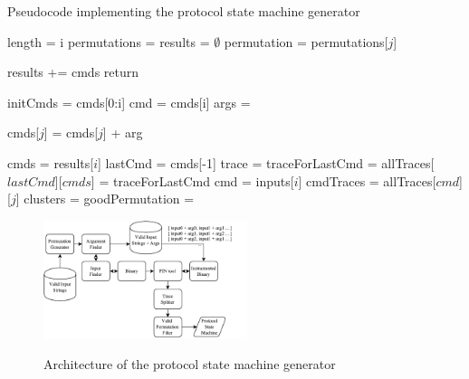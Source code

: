 \documentclass{acm_proc_article-sp}
\begin{document}
\begin{algorithm}
\caption{Pseudocode implementing the protocol state machine generator}
\label{psmcode}
\begin{algorithmic}[1]
\State length = i
\State permutations = 
\State results = $\emptyset$
\State permutation = permutations[$j$]
\State {}
\EndFor
\State {}
\EndFor
\EndProcedure

\State results += cmds
\State return
\EndIf

\State initCmds = cmds[0:i]
\State cmd = cmds[i]
\State args = 

\State cmds[$j$] = cmds[$j$] + arg
\State {}
\EndFor
\EndProcedure

\State cmds = results[$i$]
\State lastCmd = cmds[-1]
\State trace = 
\State traceForLastCmd = 
\State allTraces[$lastCmd$][$cmds$] = traceForLastCmd
\EndFor
{}
\State cmd = inputs[$i$]
\State cmdTraces = allTraces[$cmd$][$j$]
\State clusters = 
\State goodPermutation = 
\EndFor
\EndFor
\EndProcedure
\end{algorithmic}
\end{algorithm}

\begin{figure}[h!]
\caption{Architecture of the protocol state machine generator}
\centering
\includegraphics[width=0.53\textwidth]{psmarch.pdf}
\label{fig:psm_arch}
\end{figure}
\end{document}
